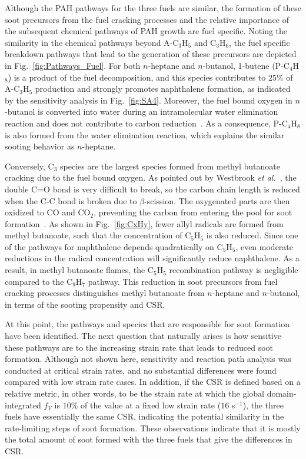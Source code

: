 Although the PAH pathways for the three fuels are similar, the formation of these soot precursors from the fuel cracking processes and the relative importance of the subsequent chemical pathways of PAH growth are fuel specific. Noting the similarity in the chemical pathways beyond A-C$_3$H$_5$ and C$_3$H$_6$, the fuel specific breakdown pathways that lead to the generation of these precursors are depicted in Fig.~\ref{fig:Pathways_Fuel}. For both $n$-heptane and $n$-butanol, 1-butene (P-C$_4$H$_8$) is a product of the fuel decomposition, and this species contributes to $25\%$ of A-C$_3$H$_5$ production and strongly promotes naphthalene formation, as indicated by the sensitivity analysis in Fig.~\ref{fig:SA4}. Moreover, the fuel bound oxygen in $n$-butanol is converted into water during an intramolecular water elimination reaction and does not contribute to carbon reduction~\cite{mcenally05,mcenally11}.  As a consequence, P-C$_4$H$_8$ is also formed from the water elimination reaction, which explains the similar sooting behavior as $n$-heptane.

Conversely, C$_3$ species are the largest species formed from methyl butanoate cracking due to the fuel bound oxygen. As pointed out by Westbrook \emph{et al.}~\cite{westbrook06}, the double C=O bond is very difficult to break, so the carbon chain length is reduced when the C-C bond is broken due to $\beta$-scission. The oxygenated parts are then oxidized to CO and CO$_2$, preventing the carbon from entering the pool for soot formation~\cite{feng12,wangyl11}. As shown in Fig.~\ref{fig:CxHy}, fewer allyl radicals are formed from methyl butanoate, such that the concentration of C$_5$H$_5$ is also reduced. Since one of the pathways for naphthalene depends quadratically on C$_5$H$_5$, even moderate reductions in the radical concentration will significantly reduce naphthalene. As a result, in methyl butanoate flames, the C$_5$H$_5$ recombination pathway is negligible compared to the C$_9$H$_7$ pathway. This reduction in soot precursors from fuel cracking processes distinguishes methyl butanoate from $n$-heptane and $n$-butanol, in terms of the sooting propensity and CSR.

At this point, the pathways and species that are responsible for soot formation have been identified. The next question that naturally arises is how sensitive these pathways are to the increasing strain rate that leads to reduced soot formation. Although not shown here, sensitivity and reaction path analysis was conducted at critical strain rates, and no substantial differences were found compared with low strain rate cases. In addition, if the CSR is defined based on a relative metric, in other words, to be the strain rate at which the global domain-integrated $f_V$ is $10\%$ of the value at a fixed low strain rate ($16$ s$^{-1}$), the three fuels have essentially the same CSR, indicating the potential similarity in the rate-limiting steps of soot formation. These observations indicate that it is mostly the total amount of soot formed with the three fuels that give the differences in CSR.

